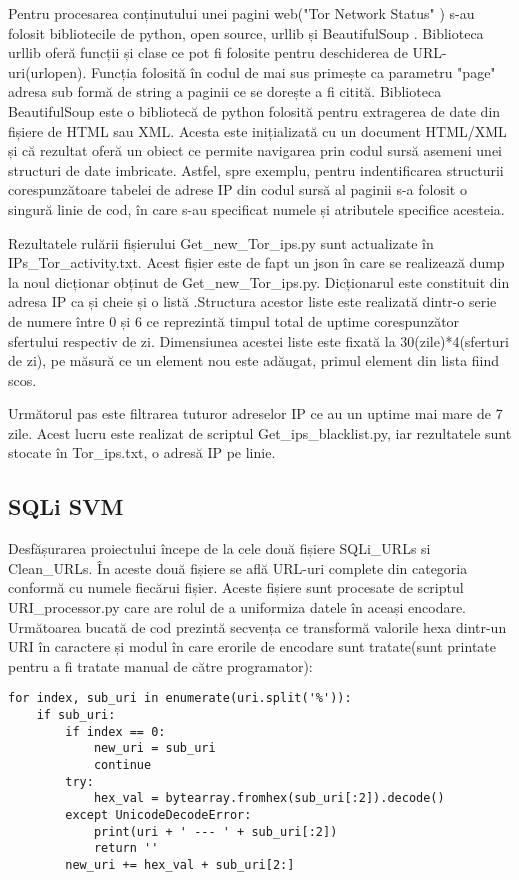 Pentru procesarea  conținutului unei pagini web("Tor Network Status" \cite{tot_status}) s-au folosit bibliotecile de python, open source, urllib și BeautifulSoup \cite{btf_soup}.  Biblioteca urllib oferă funcții și clase ce pot fi folosite pentru deschiderea de URL-uri(urlopen). Funcția folosită în codul de mai sus primește ca parametru "page" adresa sub formă de string a paginii ce se dorește a fi citită. Biblioteca BeautifulSoup este o bibliotecă de python folosită pentru extragerea de date din fișiere de HTML sau XML. Acesta este inițializată cu un document HTML/XML și că rezultat oferă un obiect ce permite navigarea prin codul sursă asemeni unei structuri de date imbricate. Astfel, spre exemplu, pentru indentificarea structurii corespunzătoare tabelei de adrese IP din codul sursă al paginii s-a folosit o singură linie de cod, în care s-au specificat numele și atributele specifice acesteia. 

Rezultatele rulării fișierului  Get\_new\_Tor\_ips.py sunt  actualizate în  IPs\_Tor\_activity.txt.  Acest fișier este de fapt un json în care se realizează dump la noul dicționar obținut de   Get\_new\_Tor\_ips.py.  Dicționarul este constituit din adresa IP ca și cheie și o listă .Structura acestor liste este realizată dintr-o serie de numere între 0 și 6 ce reprezintă timpul total de uptime corespunzător sfertului respectiv de zi. Dimensiunea acestei liste este fixată la 30(zile)*4(sferturi de zi), pe măsură ce un element nou este adăugat, primul element din lista fiind scos. 

Următorul pas este filtrarea tuturor adreselor IP ce au un uptime mai mare de 7 zile. Acest lucru este realizat de scriptul  Get\_ips\_blacklist.py, iar rezultatele sunt stocate în Tor\_ips.txt, o adresă IP pe linie. 

\subsection{SQLi SVM}
Desfășurarea proiectului începe de la cele două fișiere SQLi\_URLs si Clean\_URLs.  În aceste două fișiere se află URL-uri complete din categoria conformă cu numele fiecărui fișier. Aceste fișiere sunt procesate de scriptul  URI\_processor.py  care are rolul de a uniformiza datele în aceași encodare. Următoarea bucată de cod prezintă secvența ce transformă valorile hexa dintr-un URI în caractere și modul în care erorile de encodare sunt tratate(sunt printate pentru a fi tratate manual de către programator): 

\lstset{language=python,frame=single, showstringspaces=false}
\begin{lstlisting}
for index, sub_uri in enumerate(uri.split('%')):
    if sub_uri:
        if index == 0:
            new_uri = sub_uri
            continue
        try:
            hex_val = bytearray.fromhex(sub_uri[:2]).decode()
        except UnicodeDecodeError:
            print(uri + ' --- ' + sub_uri[:2])
            return ''
        new_uri += hex_val + sub_uri[2:]
\end{lstlisting}

